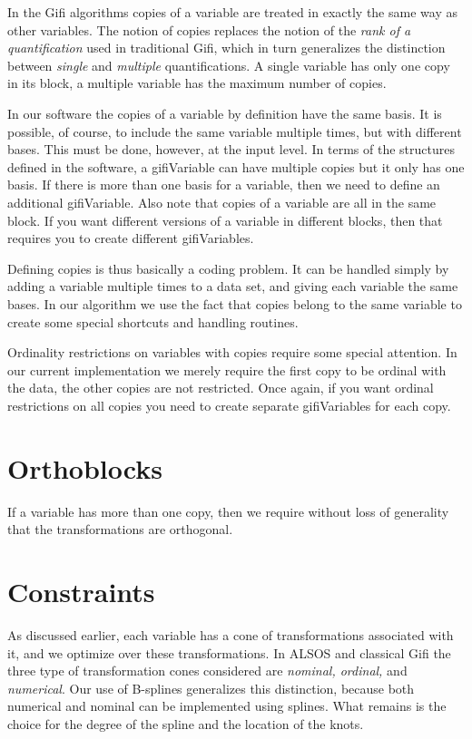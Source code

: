 \documentclass[
  12pt,
  letterpaper,
]{scrbook}
\begin{document}
In the Gifi algorithms copies of a variable are treated in exactly the
same way as other variables. The notion of copies replaces the notion of
the \emph{rank of a quantification} used in traditional Gifi, which in
turn generalizes the distinction between \emph{single} and
\emph{multiple} quantifications. A single variable has only one copy in
its block, a multiple variable has the maximum number of copies.

In our software the copies of a variable by definition have the same
basis. It is possible, of course, to include the same variable multiple
times, but with different bases. This must be done, however, at the
input level. In terms of the structures defined in the software, a
gifiVariable can have multiple copies but it only has one basis. If
there is more than one basis for a variable, then we need to define an
additional gifiVariable. Also note that copies of a variable are all in
the same block. If you want different versions of a variable in
different blocks, then that requires you to create different
gifiVariables.

Defining copies is thus basically a coding problem. It can be handled
simply by adding a variable multiple times to a data set, and giving
each variable the same bases. In our algorithm we use the fact that
copies belong to the same variable to create some special shortcuts and
handling routines.

Ordinality restrictions on variables with copies require some special
attention. In our current implementation we merely require the first
copy to be ordinal with the data, the other copies are not restricted.
Once again, if you want ordinal restrictions on all copies you need to
create separate gifiVariables for each copy.

\section{Orthoblocks}\label{orthoblocks}

If a variable has more than one copy, then we require without loss of
generality that the transformations are orthogonal.

\section{Constraints}\label{constraints}

As discussed earlier, each variable has a cone of transformations
associated with it, and we optimize over these transformations. In ALSOS
and classical Gifi the three type of transformation cones considered are
\emph{nominal, ordinal,} and \emph{numerical}. Our use of B-splines
generalizes this distinction, because both numerical and nominal can be
implemented using splines. What remains is the choice for the degree of
the spline and the location of the knots.
\end{document}
